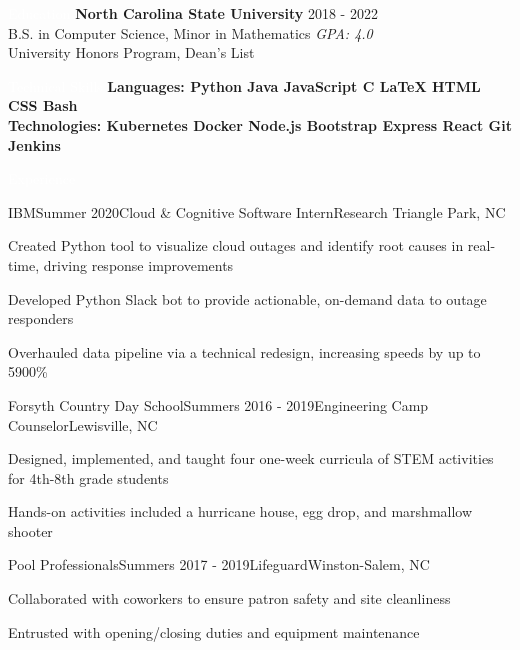 \documentclass{resume} %
\begin{document}
\setlength\fboxsep{0.33em}

\begin{rSection}{\colorbox{NCSURED}{\textcolor{WHITE}{Education}}}
{\bf North Carolina State University} \hfill {2018 - 2022} \\ 
B.S. in Computer Science, Minor in Mathematics \hfill {\em GPA: 4.0}\\
University Honors Program, Dean's List

\end{rSection}


\begin{rSection}{\colorbox{NCSURED}{\textcolor{WHITE}{Technical Skills}}}
	\textbf{
		{Languages:}
		{ Python} \textbar
		{ Java} \textbar
		{ JavaScript} \textbar
		{ C} \textbar
		{ \LaTeX} \textbar
		{ HTML} \textbar
		{ CSS} \textbar
		{ Bash} \\
		{Technologies:}
		{ Kubernetes} \textbar
		{ Docker} \textbar
		{ Node.js} \textbar
		{ Bootstrap} \textbar
		{ Express} \textbar
		{ React} \textbar
		{ Git} \textbar
		{ Jenkins}
	}	
\end{rSection}


\begin{rSection}{\colorbox{NCSURED}{\textcolor{WHITE}{Experience}}}
	\begin{rSubsection}{IBM}{Summer 2020}{Cloud \& Cognitive Software Intern}{Research Triangle Park, NC}
		\item Created Python tool to visualize cloud outages and identify root causes in real-time, driving response improvements
		\item Developed Python Slack bot to provide actionable, on-demand data to outage responders
		\item Overhauled data pipeline via a technical redesign, increasing speeds by up to 5900\%
	\end{rSubsection}

	\begin{rSubsection}{Forsyth Country Day School}{Summers 2016 - 2019}{Engineering Camp Counselor}{Lewisville, NC}
		\item Designed, implemented, and taught four one-week curricula of STEM activities for 4th-8th grade students
		\item Hands-on activities included a hurricane house, egg drop, and marshmallow shooter
	\end{rSubsection}

	\begin{rSubsection}{Pool Professionals}{Summers 2017 - 2019}{Lifeguard}{Winston-Salem, NC}
		\item Collaborated with coworkers to ensure patron safety and site cleanliness
		\item Entrusted with opening/closing duties and equipment maintenance  
	\end{rSubsection}	
\end{rSection}
\end{document}
